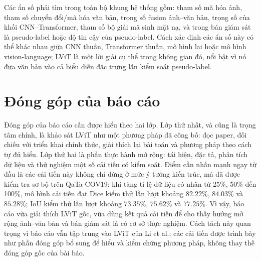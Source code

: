 Các ẩn số phải tìm trong toàn bộ khung hệ thống gồm: tham số mã hóa ảnh, tham số chuyển đổi/mã hóa văn bản, trọng số fusion ảnh--văn bản, trọng số của khối CNN--Transformer, tham số bộ giải mã sinh mặt nạ, và trong bán giám sát là pseudo-label hoặc độ tin cậy của pseudo-label. Cách xác định các ẩn số này có thể khác nhau giữa CNN thuần, Transformer thuần, mô hình lai hoặc mô hình vision-language; LViT là một lời giải cụ thể trong không gian đó, nổi bật vì nó đưa văn bản vào cả biểu diễn đặc trưng lẫn kiểm soát pseudo-label.

\section{Đóng góp của báo cáo}

Đóng góp của báo cáo cần được hiểu theo hai lớp. Lớp thứ nhất, và cũng là trọng tâm chính, là khảo sát LViT như một phương pháp đã công bố: đọc paper, đối chiếu với triển khai chính thức, giải thích lại bài toán và phương pháp theo cách tự đủ hiểu. Lớp thứ hai là phần thực hành mở rộng: tái hiện, đặc tả, phân tích dữ liệu và thử nghiệm một số cải tiến có kiểm soát. Điểm cần nhấn mạnh ngay từ đầu là các cải tiến này không chỉ dừng ở mức ý tưởng kiến trúc, mà đã được kiểm tra sơ bộ trên QaTa-COV19: khi tăng tỉ lệ dữ liệu có nhãn từ 25\%, 50\% đến 100\%, mô hình cải tiến đạt Dice kiểm thử lần lượt khoảng \(82.22\%\), \(84.03\%\) và \(85.28\%\); IoU kiểm thử lần lượt khoảng \(73.35\%\), \(75.62\%\) và \(77.25\%\). Vì vậy, báo cáo vừa giải thích LViT gốc, vừa dùng kết quả cải tiến để cho thấy hướng mở rộng ảnh--văn bản và bán giám sát là có cơ sở thực nghiệm. Cách tách này quan trọng vì báo cáo vẫn tập trung vào LViT của Li et al.; các cải tiến được trình bày như phần đóng góp bổ sung để hiểu và kiểm chứng phương pháp, không thay thế đóng góp gốc của bài báo.


